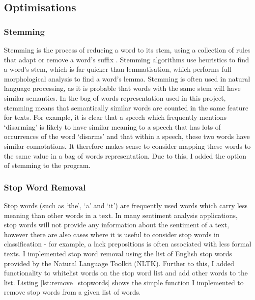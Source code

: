 \documentclass[12pt,a4paper,twoside,openright]{report}
\newcommand{\mylisting}[4]{}
\newcommand{\pylisting}[2]{\mylisting{Python}{py}{#1}{#2}}
\begin{document}
\subsection{Optimisations}

\subsubsection{Stemming}

Stemming is the process of reducing a word to its stem, using a collection of rules that adapt or remove a word's suffix \cite{porter1980algorithm}. Stemming algorithms use heuristics to find a word's stem, which is far quicker than lemmatisation, which performs full morphological analysis to find a word's lemma. Stemming is often used in natural language processing, as it is probable that words with the same stem will have similar semantics. In the bag of words representation used in this project, stemming means that semantically similar words are counted in the same feature for texts. For example, it is clear that a speech which frequently mentions `disarming' is likely to have similar meaning to a speech that has lots of occurrences of the word `disarms' and that within a speech, these two words have similar connotations. It therefore makes sense to consider mapping these words to the same value in a bag of words representation. Due to this, I added the option of stemming to the program.

\subsubsection{Stop Word Removal}

Stop words (such as `the', `a' and `it') are frequently used words which carry less meaning than other words in a text. In many sentiment analysis applications, stop words will not provide any information about the sentiment of a text, however there are also cases where it is useful to consider stop words in classification - for example, a lack prepositions is often associated with less formal texts. I implemented stop word removal using the list of English stop words provided by the Natural Language Toolkit (NLTK). Further to this, I added functionality to whitelist words on the stop word list and add other words to the list. Listing \ref{lst:remove_stopwords} shows the simple function I implemented to remove stop words from a given list of words.

\pylisting{A function which removes the stop words and words on from a given list of words.}{remove_stopwords}
\end{document}
